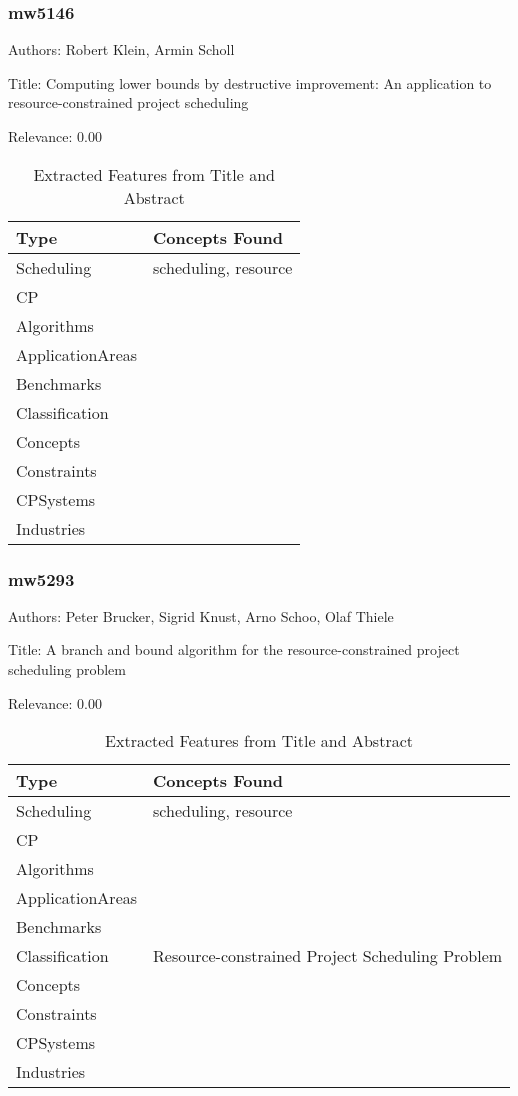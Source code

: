 \subsubsection{mw5146}
\label{mw:mw5146}

Authors: Robert Klein, Armin Scholl

Title: Computing lower bounds by destructive improvement: An application to resource-constrained project scheduling

Relevance:  0.00

{\scriptsize
\begin{longtable}{p{2cm}p{20cm}}
\caption{Extracted Features from Title and Abstract}\\ \toprule
Type & Concepts Found\\ \midrule
\endhead
\bottomrule
\endfoot
Scheduling & scheduling, resource\\ 
CP & \\ 
Algorithms & \\ 
ApplicationAreas & \\ 
Benchmarks & \\ 
Classification & \\ 
Concepts & \\ 
Constraints & \\ 
CPSystems & \\ 
Industries & \\ 
\end{longtable}
}



\subsubsection{mw5293}
\label{mw:mw5293}

Authors: Peter Brucker, Sigrid Knust, Arno Schoo, Olaf Thiele

Title: A branch and bound algorithm for the resource-constrained project scheduling problem

Relevance:  0.00

{\scriptsize
\begin{longtable}{p{2cm}p{20cm}}
\caption{Extracted Features from Title and Abstract}\\ \toprule
Type & Concepts Found\\ \midrule
\endhead
\bottomrule
\endfoot
Scheduling & scheduling, resource\\ 
CP & \\ 
Algorithms & \\ 
ApplicationAreas & \\ 
Benchmarks & \\ 
Classification & Resource-constrained Project Scheduling Problem\\ 
Concepts & \\ 
Constraints & \\ 
CPSystems & \\ 
Industries & \\ 
\end{longtable}
}



